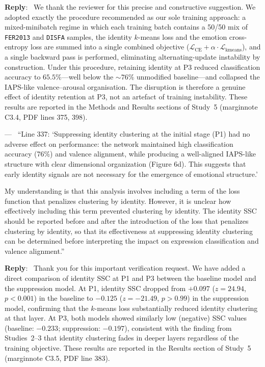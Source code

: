 \documentclass[11pt]{article}
\newcounter{reviewer}
\newcounter{point}[reviewer]
\renewcommand{\thepoint}{Comment\,\thereviewer.\arabic{point}}
\newenvironment{point}
   {\refstepcounter{point} \bigskip \noindent {\textbf{\thepoint} } ---\ }
   {\par }
\newenvironment{reply}
   {\medskip \noindent \color{blue} \begin{sf}\textbf{Reply}:\  }
   {\medskip \par \end{sf}}
\begin{document}
\begin{reply}
We thank the reviewer for this precise and constructive suggestion. We adopted exactly the procedure recommended as our sole training approach: a mixed-minibatch regime in which each training batch contains a 50/50 mix of \texttt{FER2013} and \texttt{DISFA} samples, the identity $k$-means loss and the emotion cross-entropy loss are summed into a single combined objective ($\mathcal{L}_{\mathrm{CE}} + \alpha \cdot \mathcal{L}_{\mathrm{kmeans}}$), and a single backward pass is performed, eliminating alternating-update instability by construction. Under this procedure, retaining identity at \textsf{P3} reduced classification accuracy to $65.5\%$---well below the ${\sim}76\%$ unmodified baseline---and collapsed the IAPS-like valence--arousal organisation. The disruption is therefore a genuine effect of identity retention at \textsf{P3}, not an artefact of training instability. These results are reported in the Methods and Results sections of Study~5 (marginnote C3.4, PDF lines 375, 398).
\end{reply}

\begin{point}
``Line 337: `Suppressing identity clustering at the initial stage (P1) had no adverse effect on performance: the network maintained high classification accuracy (76\%) and valence alignment, while producing a well-aligned IAPS-like structure with clear dimensional organization (Figure 6d). This suggests that early identity signals are not necessary for the emergence of emotional structure.'

My understanding is that this analysis involves including a term of the loss function that penalizes clustering by identity. However, it is unclear how effectively including this term prevented clustering by identity. The identity SSC should be reported before and after the introduction of the loss that penalizes clustering by identity, so that its effectiveness at suppressing identity clustering can be determined before interpreting the impact on expression classification and valence alignment.''
\label{comment_2_5}
\end{point}

\begin{reply}
Thank you for this important verification request. We have added a direct comparison of identity SSC at P1 and P3 between the baseline model and the suppression model. At P1, identity SSC dropped from $+0.097$ ($z = 24.94$, $p < 0.001$) in the baseline to $-0.125$ ($z = -21.49$, $p > 0.99$) in the suppression model, confirming that the $k$-means loss substantially reduced identity clustering at that layer. At P3, both models showed similarly low (negative) SSC values (baseline: $-0.233$; suppression: $-0.197$), consistent with the finding from Studies~2--3 that identity clustering fades in deeper layers regardless of the training objective. These results are reported in the Results section of Study~5 (marginnote C3.5, PDF line 383).
\end{reply}
\end{document}
